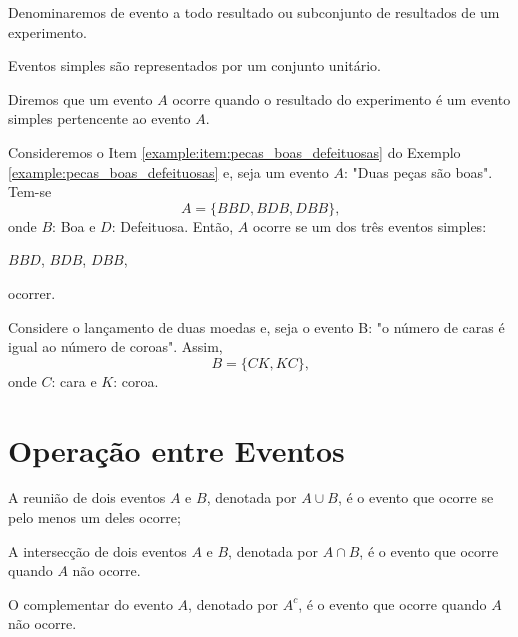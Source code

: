 \documentclass[11pt,fleqn]{book}
\numberwithin{mpicture}{chapter}
\numberwithin{mtable}{chapter}
\numberwithin{mframe}{chapter}
\begin{document}
\begin{definition}
	Denominaremos de evento a todo resultado ou subconjunto de resultados de um experimento.
\end{definition}

\begin{remark}
	Eventos simples são representados por um conjunto unitário.
\end{remark}

\begin{remark}
	Diremos que um evento $A$ ocorre quando o resultado do experimento é um evento simples pertencente ao evento $A$.
\end{remark}

\begin{example}
	Consideremos o Item \ref{example:item:pecas_boas_defeituosas} do Exemplo \ref{example:pecas_boas_defeituosas} e, seja um evento $A$: "Duas peças são boas". Tem-se
	\[
		A=\{BBD, BDB, DBB\}\text{,}
	\]
	onde $B$: Boa e $D$: Defeituosa. Então, $A$ ocorre se um dos três eventos simples:
	\begin{center}
		$BBD$, $BDB$, $DBB$,
	\end{center}
	ocorrer.
\end{example}

\begin{example}
	Considere o lançamento de duas moedas e, seja o evento B: "o número de caras é igual ao número de coroas". Assim,
	\[
		B=\{CK, KC\}\text{,}
	\]
	onde $C$: cara e $K$: coroa.
\end{example}

\section{Operação entre Eventos}

\begin{definition}
	\label{def:reuniao_dois_eventos}
	A reunião de dois eventos $A$ e $B$, denotada por $A\cup B$, é o evento que ocorre se pelo menos um deles ocorre;
\end{definition}

\begin{definition}
	\label{def:intercecao_dois_eventos}
	A intersecção de dois eventos $A$ e $B$, denotada por $A\cap B$, é o evento que ocorre quando $A$ não ocorre.
\end{definition}

\begin{definition}
	\label{def:complementar_evento}
	O complementar do evento $A$, denotado por $A^{c}$, é o evento que ocorre quando $A$ não ocorre.
\end{definition}
\end{document}

